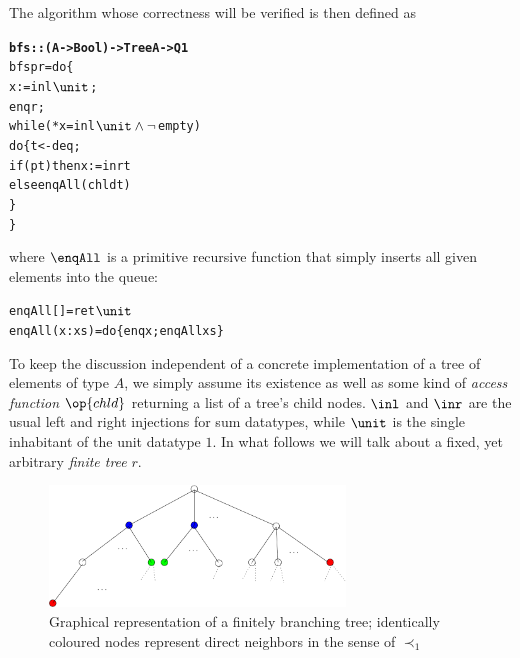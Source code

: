 The algorithm whose correctness will be verified is then defined as 

\begin{alltt}
\textbf{bfs :: (A -> Bool) -> Tree A -> Q 1}
bfs p r = do \{
    x := inl \(\unit\);
    enq r;
    while (*x = inl \(\unit \land \lnot \)empty)
          do \{ t <- deq;
               if (p t) then x := inr t
                        else enqAll (chld t)
             \}
    \}
\end{alltt}

where $\enqAll$ is a primitive recursive function that simply inserts all given
elements into the queue:
\begin{alltt}
    enqAll []     = ret \(\unit\)
    enqAll (x:xs) = do \{ enq x; enqAll xs \} 
\end{alltt}

To keep the discussion independent of a concrete implementation of a tree of
elements of type $A$, we simply assume its existence as well as some kind of
\emph{access function} $\op{chld}$ returning a list of a tree's child
nodes. $\inl$ and $\inr$ are the usual left and right injections
for sum datatypes, while $\unit$ is the single inhabitant
of the unit datatype $1$. In what follows we will talk about a fixed, yet arbitrary
\emph{finite tree} $r$.

\begin{figure}
  \centering
  \includegraphics[width=0.7\textwidth]{tree}
  \caption{Graphical representation of a finitely branching tree; identically
    coloured nodes represent direct neighbors in the sense of $\prec_{1}$}
  \label{fig:finite-tree}
\end{figure}

